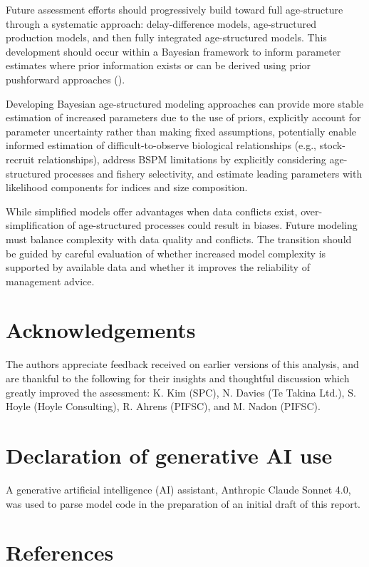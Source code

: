 \documentclass[
  11pt,
]{SCreport}
\begin{document}
Future assessment efforts should progressively build toward full
age-structure through a systematic approach: delay-difference models,
age-structured production models, and then fully integrated
age-structured models. This development should occur within a Bayesian
framework to inform parameter estimates where prior information exists
or can be derived using prior pushforward approaches
().

Developing Bayesian age-structured modeling approaches can provide more
stable estimation of increased parameters due to the use of priors,
explicitly account for parameter uncertainty rather than making fixed
assumptions, potentially enable informed estimation of
difficult-to-observe biological relationships (e.g., stock-recruit
relationships), address BSPM limitations by explicitly considering
age-structured processes and fishery selectivity, and estimate leading
parameters with likelihood components for indices and size composition.

While simplified models offer advantages when data conflicts exist,
over-simplification of age-structured processes could result in biases.
Future modeling must balance complexity with data quality and conflicts.
The transition should be guided by careful evaluation of whether
increased model complexity is supported by available data and whether it
improves the reliability of management advice.

\section{Acknowledgements}\label{sec-acknowledgements}

The authors appreciate feedback received on earlier versions of this
analysis, and are thankful to the following for their insights and
thoughtful discussion which greatly improved the assessment: K. Kim
(SPC), N. Davies (Te Takina Ltd.), S. Hoyle (Hoyle Consulting), R.
Ahrens (PIFSC), and M. Nadon (PIFSC).

\section{Declaration of generative AI use}\label{sec-ai-declaration}

A generative artificial intelligence (AI) assistant, Anthropic Claude
Sonnet 4.0, was used to parse model code in the preparation of an
initial draft of this report.

\section{References}\label{sec-refs}
\end{document}
